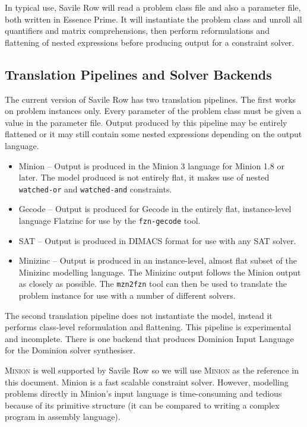 \documentclass[a4paper]{article}
\newcommand{\eprime}{{\sc Essence Prime}\xspace}
\newcommand{\savilerow}{{\sc Savile Row}\xspace}
\begin{document}
In typical use, \savilerow will read a problem class file and also a parameter file, 
both written in  \eprime. It will instantiate the problem class and unroll all quantifiers
and matrix comprehensions, then perform reformulations and flattening of nested expressions before 
producing output for a constraint solver. 

\subsection{Translation Pipelines and Solver Backends}\label{sub:backends}

The current version of \savilerow has two translation pipelines. The first 
works on problem instances only. Every parameter of the problem class must be 
given a value in the parameter file. Output produced by this pipeline may be 
entirely flattened or it may still contain some nested expressions depending on the
output language. 

\begin{itemize}
\item Minion -- Output is produced in the Minion 3 language for Minion 1.8 or later. 
The model produced is not entirely flat, it makes use of nested \texttt{watched-or} and \texttt{watched-and}
constraints.
\item Gecode -- Output is produced for Gecode in the entirely flat, instance-level language
Flatzinc for use by the \texttt{fzn-gecode} tool. 
\item SAT -- Output is produced in DIMACS format for use with any SAT solver. 
\item Minizinc -- Output is produced in an instance-level, almost flat subset of the Minizinc modelling language. 
The Minizinc output follows the Minion output as closely as possible. The \texttt{mzn2fzn} tool can then be used to translate
the problem instance for use with a number of different solvers. 
\end{itemize}

The second translation pipeline does not instantiate the model, instead it performs
class-level reformulation and flattening. This pipeline is experimental and incomplete. There is one backend 
that produces Dominion Input Language for the Dominion solver synthesiser.

\textsc{Minion} is well supported by \savilerow so we will use \textsc{Minion} as the reference
in this document. {\sc Minion} is a fast scalable constraint solver. 
However, modelling problems directly in {\sc Minion}'s input
language is time-consuming and tedious because of its 
primitive structure (it can be compared to writing a 
complex program in assembly language).
\end{document}
